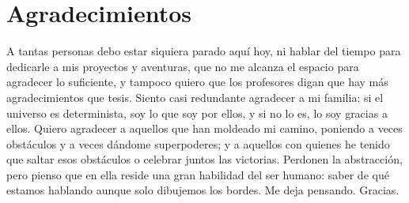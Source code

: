 
\chapter*{Agradecimientos}
A tantas personas debo estar siquiera parado aquí hoy, ni hablar del tiempo para dedicarle a mis proyectos y aventuras, que no me alcanza el espacio para agradecer lo suficiente, y tampoco quiero que los profesores digan que hay más agradecimientos que tesis. Siento casi redundante agradecer a mi familia: si el universo es determinista, soy lo que soy por ellos, y si no lo es, lo soy gracias a ellos. Quiero agradecer a aquellos que han moldeado mi camino, poniendo a veces obstáculos y a veces dándome superpoderes; y a aquellos con quienes he tenido que saltar esos obstáculos o celebrar juntos las victorias. Perdonen la abstracción, pero pienso que en ella reside una gran habilidad del ser humano: saber de qué estamos hablando aunque solo dibujemos los bordes. Me deja pensando. Gracias.

